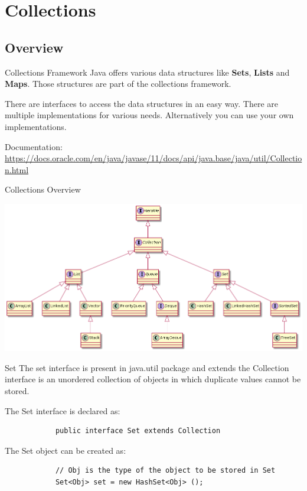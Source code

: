 	
	\section{Collections}
	
	
	
	\subsection{Overview}
	\begin{frame}{Collections Framework}
		Java offers various data structures like \textbf{Sets}, \textbf{Lists} and \textbf{Maps}.
		Those structures are part of the collections framework.
		
		There are interfaces to access the data structures in an easy way.
		There are multiple implementations for various needs.
		Alternatively you can use your own implementations.
		
		Documentation: \url{https://docs.oracle.com/en/java/javase/11/docs/api/java.base/java/util/Collection.html}
	\end{frame}
	
	\begin{frame}{Collections Overview}
		
		\includegraphics[width=\textwidth]{07_collection/collection.png}
	\end{frame}
	
	\begin{frame}[fragile]{Set}
		The set interface is present in java.util package and extends the Collection interface is an unordered collection of objects in which duplicate values cannot be stored. 
		
		The Set interface is declared as:
		\begin{lstlisting}
			public interface Set extends Collection 
		\end{lstlisting}
		
		The Set object can be created as:
		\begin{lstlisting}
			// Obj is the type of the object to be stored in Set 
			Set<Obj> set = new HashSet<Obj> (); 
		\end{lstlisting}
		
	\end{frame}
	
